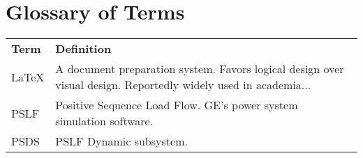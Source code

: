 \chapter*{Glossary of Terms}
\vspace{-1em}

\begin{table}[h]
	\begin{tabular}{@{} p{.25\linewidth} p{.7\linewidth} @{}} %
	\textbf{Term} & \textbf{Definition}\\
	\LaTeX 			& A document preparation system. Favors logical design over visual design. Reportedly widely used in academia... \\
	PSLF 	&	Positive Sequence Load Flow. GE's power system simulation software.\\
	PSDS	&	PSLF Dynamic subsystem.
	\end{tabular}
\end{table}
